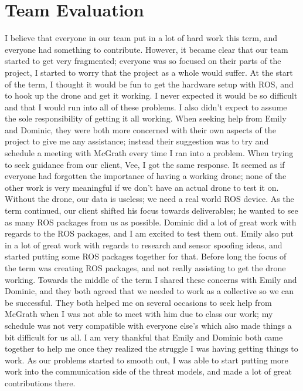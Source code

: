 \documentclass[IEEEtran,letterpaper,10pt,notitlepage,draftclsnofoot,onecolumn]{article}
\begin{document}
\section{Team Evaluation}
I believe that everyone in our team put in a lot of hard work this term, and everyone had something to contribute. However, it became clear that our team started to get very fragmented; everyone was so focused on their parts of the project, I started to worry that the project as a whole would suffer. At the start of the term, I thought it would be fun to get the hardware setup with ROS, and to hook up the drone and get it working. I never expected it would be so difficult and that I would run into all of these problems. I also didn't expect to assume the sole responsibility of getting it all working. When seeking help from Emily and Dominic, they were both more concerned with their own aspects of the project to give me any assistance; instead their suggestion was to try and schedule a meeting with McGrath every time I ran into a problem. When trying to seek guidance from our client, Vee, I got the same response. It seemed as if everyone had forgotten the importance of having a working drone; none of the other work is very meaningful if we don't have an actual drone to test it on. Without the drone, our data is useless; we need a real world ROS device. As the term continued, our client shifted his focus towards deliverables; he wanted to see as many ROS packages from us as possible. Dominic did a lot of great work with regards to the ROS packages, and I am excited to test them out. Emily also put in a lot of great work with regards to research and sensor spoofing ideas, and started putting some ROS packages together for that. Before long the focus of the term was creating ROS packages, and not really assisting to get the drone working. Towards the middle of the term I shared these concerns with Emily and Dominic, and they both agreed that we needed to work as a collective so we can be successful. They both helped me on several occasions to seek help from McGrath when I was not able to meet with him due to class our work; my schedule was not very compatible with everyone else's which also made things a bit difficult for us all. I am very thankful that Emily and Dominic both came together to help me once they realized the struggle I was having getting things to work. As our problems started to smooth out, I was able to start putting more work into the communication side of the threat models, and made a lot of great contributions there.
\end{document}

